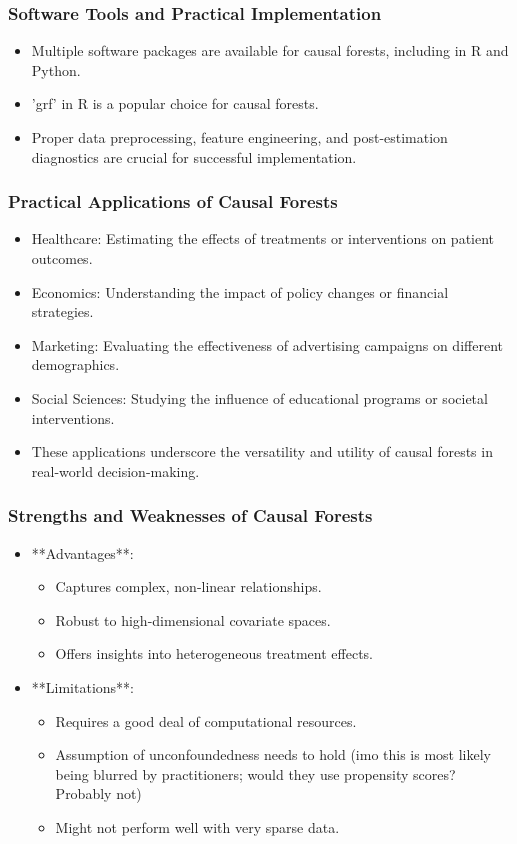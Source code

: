 \documentclass{beamer}
\begin{document}
\begin{frame}
\frametitle{Software Tools and Practical Implementation}
\begin{itemize}
    \item Multiple software packages are available for causal forests, including in R and Python.
    \item 'grf' in R is a popular choice for causal forests.
    \item Proper data preprocessing, feature engineering, and post-estimation diagnostics are crucial for successful implementation.
\end{itemize}
\end{frame}




\begin{frame}
\frametitle{Practical Applications of Causal Forests}
\begin{itemize}
    \item Healthcare: Estimating the effects of treatments or interventions on patient outcomes.
    \item Economics: Understanding the impact of policy changes or financial strategies.
    \item Marketing: Evaluating the effectiveness of advertising campaigns on different demographics.
    \item Social Sciences: Studying the influence of educational programs or societal interventions.
    \item These applications underscore the versatility and utility of causal forests in real-world decision-making.
\end{itemize}
\end{frame}


\begin{frame}
\frametitle{Strengths and Weaknesses of Causal Forests}
\begin{itemize}
    \item **Advantages**:
        \begin{itemize}
            \item Captures complex, non-linear relationships.
            \item Robust to high-dimensional covariate spaces.
            \item Offers insights into heterogeneous treatment effects.
        \end{itemize}
    \item **Limitations**:
        \begin{itemize}
            \item Requires a good deal of computational resources.
            \item Assumption of unconfoundedness needs to hold (imo this is most likely being blurred by practitioners; would they use propensity scores?  Probably not)
            \item Might not perform well with very sparse data.
        \end{itemize}
\end{itemize}
\end{frame}
\end{document}

